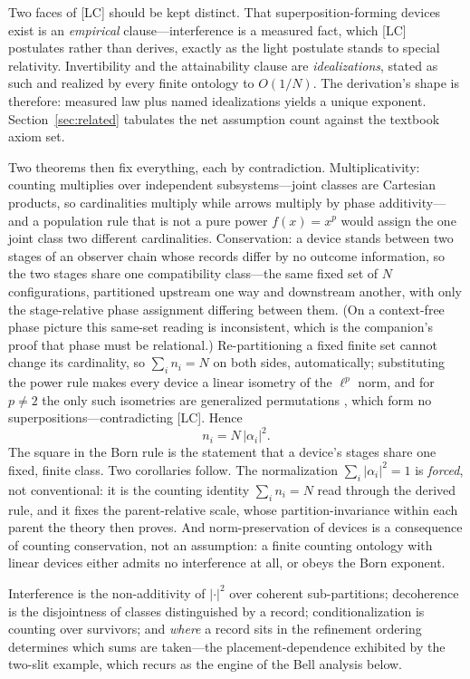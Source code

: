 \documentclass[11pt]{article}
\theoremstyle{definition}
\theoremstyle{remark}
\begin{document}
Two faces of [LC] should be kept distinct. That superposition-forming devices exist is an \emph{empirical} clause---interference is a measured fact, which [LC] postulates rather than derives, exactly as the light postulate stands to special relativity. Invertibility and the attainability clause are \emph{idealizations}, stated as such and realized by every finite ontology to $O(1/N)$. The derivation's shape is therefore: measured law plus named idealizations yields a unique exponent. Section~\ref{sec:related} tabulates the net assumption count against the textbook axiom set.

Two theorems then fix everything, each by contradiction. Multiplicativity: counting multiplies over independent subsystems---joint classes are Cartesian products, so cardinalities multiply while arrows multiply by phase additivity---and a population rule that is not a pure power $f(x) = x^p$ would assign the one joint class two different cardinalities. Conservation: a device stands between two stages of an observer chain whose records differ by no outcome information, so the two stages share one compatibility class---the same fixed set of $N$ configurations, partitioned upstream one way and downstream another, with only the stage-relative phase assignment differing between them. (On a context-free phase picture this same-set reading is inconsistent, which is the companion's proof that phase must be relational.) Re-partitioning a fixed finite set cannot change its cardinality, so $\sum_i n_i = N$ on both sides, automatically; substituting the power rule makes every device a linear isometry of the $\ell^p$ norm, and for $p \neq 2$ the only such isometries are generalized permutations \cite{Lamperti1958}, which form no superpositions---contradicting [LC]. Hence
\[ n_i = N\,|\alpha_i|^2 . \]
The square in the Born rule is the statement that a device's stages share one fixed, finite class. Two corollaries follow. The normalization $\sum_i |\alpha_i|^2 = 1$ is \emph{forced}, not conventional: it is the counting identity $\sum_i n_i = N$ read through the derived rule, and it fixes the parent-relative scale, whose partition-invariance within each parent the theory then proves. And norm-preservation of devices is a consequence of counting conservation, not an assumption: a finite counting ontology with linear devices either admits no interference at all, or obeys the Born exponent.

Interference is the non-additivity of $|\cdot|^2$ over coherent sub-partitions; decoherence is the disjointness of classes distinguished by a record; conditionalization is counting over survivors; and \emph{where} a record sits in the refinement ordering determines which sums are taken---the placement-dependence exhibited by the two-slit example, which recurs as the engine of the Bell analysis below.
\end{document}
